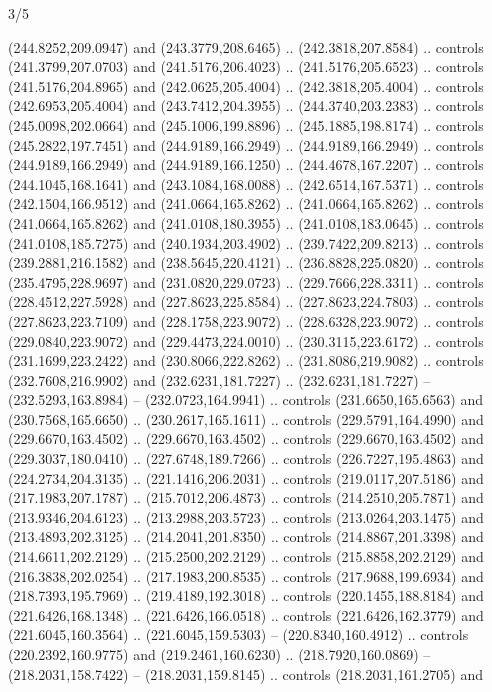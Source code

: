 \begin{flagdescription}{3/5}
\begin{scope}[xshift=0.5\flaglength,yshift=0.5\flagwidth,scale=\flagwidth/270]
\begin{scope}[y=0.8pt, x=0.8pt, yscale=-1,shift={(-281.25,-168.75)}]
  (244.8252,209.0947) and (243.3779,208.6465) .. (242.3818,207.8584) .. controls
  (241.3799,207.0703) and (241.5176,206.4023) .. (241.5176,205.6523) .. controls
  (241.5176,204.8965) and (242.0625,205.4004) .. (242.3818,205.4004) .. controls
  (242.6953,205.4004) and (243.7412,204.3955) .. (244.3740,203.2383) .. controls
  (245.0098,202.0664) and (245.1006,199.8896) .. (245.1885,198.8174) .. controls
  (245.2822,197.7451) and (244.9189,166.2949) .. (244.9189,166.2949) .. controls
  (244.9189,166.2949) and (244.9189,166.1250) .. (244.4678,167.2207) .. controls
  (244.1045,168.1641) and (243.1084,168.0088) .. (242.6514,167.5371) .. controls
  (242.1504,166.9512) and (241.0664,165.8262) .. (241.0664,165.8262) .. controls
  (241.0664,165.8262) and (241.0108,180.3955) .. (241.0108,183.0645) .. controls
  (241.0108,185.7275) and (240.1934,203.4902) .. (239.7422,209.8213) .. controls
  (239.2881,216.1582) and (238.5645,220.4121) .. (236.8828,225.0820) .. controls
  (235.4795,228.9697) and (231.0820,229.0723) .. (229.7666,228.3311) .. controls
  (228.4512,227.5928) and (227.8623,225.8584) .. (227.8623,224.7803) .. controls
  (227.8623,223.7109) and (228.1758,223.9072) .. (228.6328,223.9072) .. controls
  (229.0840,223.9072) and (229.4473,224.0010) .. (230.3115,223.6172) .. controls
  (231.1699,223.2422) and (230.8066,222.8262) .. (231.8086,219.9082) .. controls
  (232.7608,216.9902) and (232.6231,181.7227) .. (232.6231,181.7227) --
  (232.5293,163.8984) -- (232.0723,164.9941) .. controls (231.6650,165.6563) and
  (230.7568,165.6650) .. (230.2617,165.1611) .. controls (229.5791,164.4990) and
  (229.6670,163.4502) .. (229.6670,163.4502) .. controls (229.6670,163.4502) and
  (229.3037,180.0410) .. (227.6748,189.7266) .. controls (226.7227,195.4863) and
  (224.2734,204.3135) .. (221.1416,206.2031) .. controls (219.0117,207.5186) and
  (217.1983,207.1787) .. (215.7012,206.4873) .. controls (214.2510,205.7871) and
  (213.9346,204.6123) .. (213.2988,203.5723) .. controls (213.0264,203.1475) and
  (213.4893,202.3125) .. (214.2041,201.8350) .. controls (214.8867,201.3398) and
  (214.6611,202.2129) .. (215.2500,202.2129) .. controls (215.8858,202.2129) and
  (216.3838,202.0254) .. (217.1983,200.8535) .. controls (217.9688,199.6934) and
  (218.7393,195.7969) .. (219.4189,192.3018) .. controls (220.1455,188.8184) and
  (221.6426,168.1348) .. (221.6426,166.0518) .. controls (221.6426,162.3779) and
  (221.6045,160.3564) .. (221.6045,159.5303) -- (220.8340,160.4912) .. controls
  (220.2392,160.9775) and (219.2461,160.6230) .. (218.7920,160.0869) --
  (218.2031,158.7422) -- (218.2031,159.8145) .. controls (218.2031,161.2705) and

\end{scope}
\end{scope}
\end{flagdescription}
